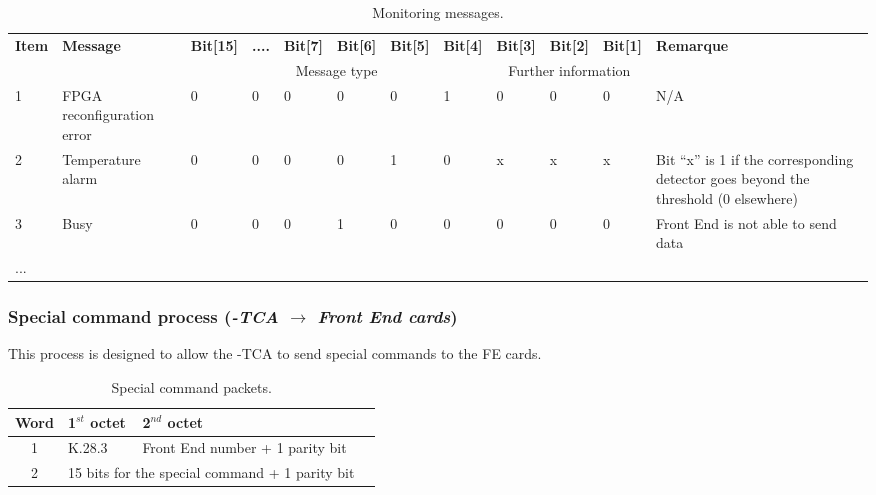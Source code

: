 \begin{table} [!htbp]
  \centering
  \caption{Monitoring messages.}
\begin{tabular}{|p{0.8cm}|p{1.7cm}|p{1.2cm}|p{0.5cm}|p{1cm}|p{1cm}|p{1cm}|p{1cm}|p{1cm}|p{1cm}|p{1cm}|p{2.5cm}|}
\hline
\bf{Item}  			& 		\bf{Message}		& \bf{Bit[15]}& \bf{....} &\bf{Bit[7]} & \bf{Bit[6]} & \bf{Bit[5]} & \bf{Bit[4]} & \bf{Bit[3]} & \bf{Bit[2]} & \bf{Bit[1]} & \bf{Remarque}\\
\cline{3-11}
				&						& \multicolumn{6}{c|}{Message type} & \multicolumn{3}{c|}{Further information} & \\
\hline
1				&	FPGA reconfiguration error 			&0&0&	0	& 0&0&1&0&0&0& N/A	\\
\hline
2				&	Temperature alarm 			&0&0&	0	& 0&1&0&x&x&x& Bit \enquote{x} is 1 if the corresponding detector goes beyond the threshold (0 elsewhere)\\
\hline
3				&	Busy							&0&0&	0	& 1&0&0&0&0&0&Front End is not able to send data\\
\hline
...				&								&	& &	& & & & & & & \\
\hline
\end{tabular}
\end{table}


\newpage
\subsubsection{Special command process (\textit{{\charmu-TCA} $\rightarrow$ Front End cards})\newline}

This process is designed to allow the \charmu-TCA to send special commands to the FE cards.

\begin{table} [!htbp]
  \centering
  \caption{Special command packets.}
\begin{tabular}{|c|p{4cm}|p{6cm}|p{6cm}|}
\hline
\bf{Word}  			& 	\bf{1$^{st}$ octet}	& \bf{2$^{nd}$ octet}\\
\hline
1			& K.28.3	& Front End number + 1 parity bit\\
\hline
2				&	 \multicolumn{2}{c|}{15 bits for the special command + 1 parity bit}\\
\hline
\end{tabular}
\end{table}

